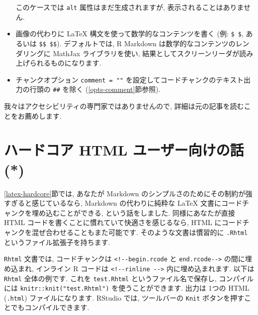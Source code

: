 \documentclass[
  11pt,
]{bxjsreport}
\begin{document}
\begin{itemize}
  このケースでは \texttt{alt} 属性はまだ生成されますが, 表示されることはありません.
\item
  画像の代わりに LaTeX 構文を使って数学的なコンテンツを書く (例: \texttt{\$ \$}, あるいは \texttt{\$\$ \$\$}). デフォルトでは, R Markdown は数学的なコンテンツのレンダリングに MathJax ライブラリを使い, 結果としてスクリーンリーダが読み上げられるものになります.
\item
  チャンクオプション \texttt{comment = ""} を設定してコードチャンクのテキスト出力の行頭の \texttt{\#\#} を除く (\ref{opts-comment}節参照).
\end{itemize}

我々はアクセシビリティの専門家ではありませんので, 詳細は元の記事を読むことをお薦めします.

\hypertarget{html-hardcore}{%
\section{ハードコア HTML ユーザー向けの話 (*)}\label{html-hardcore}}

\ref{latex-hardcore}節では, あなたが Markdown のシンプルさのためにその制約が強すぎると感じているなら, Markdown の代わりに純粋な LaTeX 文書にコードチャンクを埋め込むことができる, という話をしました. 同様にあなたが直接 HTML コードを書くことに慣れていて快適さを感じるなら, HTML にコードチャンクを混ぜ合わせることもまた可能です. そのような文書は慣習的に \texttt{.Rhtml} というファイル拡張子を持ちます.

\texttt{Rhtml} 文書では, コードチャンクは \texttt{\textless{}!-\/-begin.rcode} と \texttt{end.rcode-\/-\textgreater{}} の間に埋め込まれ, インライン R コードは \texttt{\textless{}!-\/-rinline\ -\/-\textgreater{}} 内に埋め込まれます. 以下は \texttt{Rhtml} 全体の例です. これを \texttt{test.Rhtml} というファイル名で保存し, コンパイルには \texttt{knitr::knit("test.Rhtml")} を使うことができます. 出力は 1つの HTML (\texttt{.html}) ファイルになります. RStudio では, ツールバーの \texttt{Knit} ボタンを押すことでもコンパイルできます.
\end{document}

